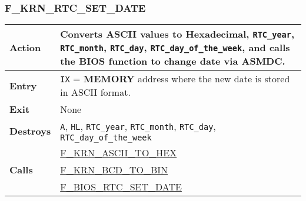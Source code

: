     \subsubsection{F\_KRN\_RTC\_SET\_DATE}
    \label{func:fkrnrtcsetdate}
    \begin{tabular}{l p{9cm}}
        \hline\textbf{Action}
        & Converts ASCII values to Hexadecimal, \texttt{RTC\_year},
        \texttt{RTC\_month}, \texttt{RTC\_day}, \texttt{RTC\_day\_of\_the\_week},
        and calls the BIOS function to change date via \textbf{ASMDC}.\\
        \hline\textbf{Entry} & \texttt{IX} = \textbf{MEMORY} address where
        the new date is stored in ASCII format.\\
        \hline\textbf{Exit} & None \\
        \hline\textbf{Destroys} & \texttt{A}, \texttt{HL}, \texttt{RTC\_year},
        \texttt{RTC\_month}, \texttt{RTC\_day}, \texttt{RTC\_day\_of\_the\_week}\\
        \hline\multirow[t]{3}{4em}{\textbf{Calls}}
        & \hyperref[func:fkrnasciitohex]{F\_KRN\_ASCII\_TO\_HEX}\\
        & \hyperref[func:fkrnbcdtobin]{F\_KRN\_BCD\_TO\_BIN}\\
        & \hyperref[func:fbiosrtcsetdate]{F\_BIOS\_RTC\_SET\_DATE}\\
        \hline
    \end{tabular}